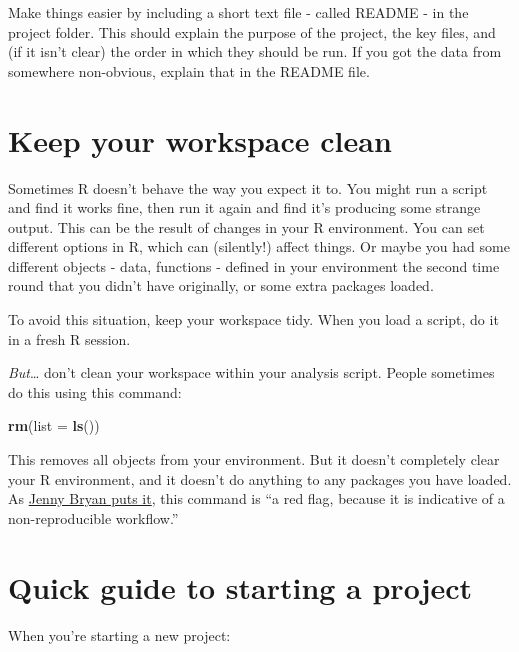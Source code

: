 \documentclass[
]{book}
\newenvironment{Shaded}{\begin{snugshade}}{\end{snugshade}}
\newcommand{\DataTypeTok}[1]{\textcolor[rgb]{0.13,0.29,0.53}{#1}}
\newcommand{\KeywordTok}[1]{\textcolor[rgb]{0.13,0.29,0.53}{\textbf{#1}}}
\newcommand{\NormalTok}[1]{#1}
\begin{document}
Make things easier by including a short text file - called README - in the project folder. This should explain the purpose of the project, the key files, and (if it isn't clear) the order in which they should be run. If you got the data from somewhere non-obvious, explain that in the README file.

\hypertarget{clean-workspace}{%
\section{Keep your workspace clean}\label{clean-workspace}}

Sometimes R doesn't behave the way you expect it to. You might run a script and find it works fine, then run it again and find it's producing some strange output. This can be the result of changes in your R environment. You can set different options in R, which can (silently!) affect things. Or maybe you had some different objects - data, functions - defined in your environment the second time round that you didn't have originally, or some extra packages loaded.

To avoid this situation, keep your workspace tidy. When you load a script, do it in a fresh R session.

\emph{But}\ldots{} don't clean your workspace within your analysis script. People sometimes do this using this command:

\begin{Shaded}
\begin{Highlighting}[]
\KeywordTok{rm}\NormalTok{(}\DataTypeTok{list =} \KeywordTok{ls}\NormalTok{())}
\end{Highlighting}
\end{Shaded}

This removes all objects from your environment. But it doesn't completely clear your R environment, and it doesn't do anything to any packages you have loaded. As \href{https://rstats.wtf/save-source.html\#rm-list-ls}{Jenny Bryan puts it}, this command is ``a red flag, because it is indicative of a non-reproducible workflow.''

\hypertarget{quick-guide}{%
\section{Quick guide to starting a project}\label{quick-guide}}

When you're starting a new project:
\end{document}
